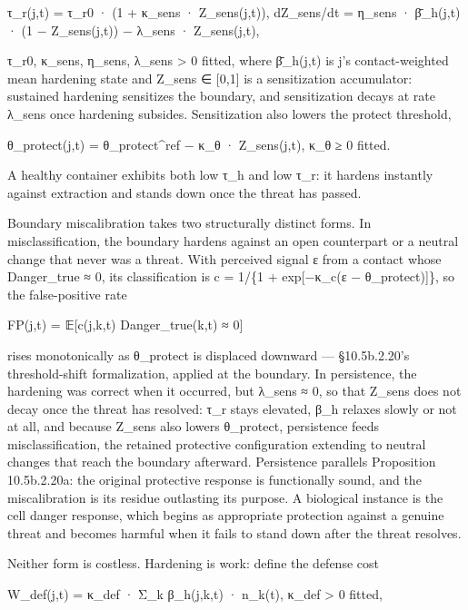 \documentclass[
]{article}
\begin{document}
τ\_r(j,t) = τ\_r0 · (1 + κ\_sens · Z\_sens(j,t)), dZ\_sens/dt = η\_sens
· β̄\_h(j,t) · (1 − Z\_sens(j,t)) − λ\_sens · Z\_sens(j,t),

τ\_r0, κ\_sens, η\_sens, λ\_sens \textgreater{} 0 fitted, where
β̄\_h(j,t) is j's contact-weighted mean hardening state and Z\_sens ∈
{[}0,1{]} is a sensitization accumulator: sustained hardening sensitizes
the boundary, and sensitization decays at rate λ\_sens once hardening
subsides. Sensitization also lowers the protect threshold,

θ\_protect(j,t) = θ\_protect\^{}ref − κ\_θ · Z\_sens(j,t), κ\_θ ≥ 0
fitted.

A healthy container exhibits both low τ\_h and low τ\_r: it hardens
instantly against extraction and stands down once the threat has passed.

Boundary miscalibration takes two structurally distinct forms. In
misclassification, the boundary hardens against an open counterpart or a
neutral change that never was a threat. With perceived signal ε from a
contact whose Danger\_true ≈ 0, its classification is c = 1/\{1 +
exp{[}−κ\_c(ε − θ\_protect){]}\}, so the false-positive rate

FP(j,t) = 𝔼{[}c(j,k,t) Danger\_true(k,t) ≈ 0{]}

rises monotonically as θ\_protect is displaced downward ---
§10.5b.2.20's threshold-shift formalization, applied at the boundary. In
persistence, the hardening was correct when it occurred, but λ\_sens ≈
0, so that Z\_sens does not decay once the threat has resolved: τ\_r
stays elevated, β\_h relaxes slowly or not at all, and because Z\_sens
also lowers θ\_protect, persistence feeds misclassification, the
retained protective configuration extending to neutral changes that
reach the boundary afterward. Persistence parallels Proposition
10.5b.2.20a: the original protective response is functionally sound, and
the miscalibration is its residue outlasting its purpose. A biological
instance is the cell danger response, which begins as appropriate
protection against a genuine threat and becomes harmful when it fails to
stand down after the threat resolves.

Neither form is costless. Hardening is work: define the defense cost

W\_def(j,t) = κ\_def · Σ\_k β\_h(j,k,t) · n\_k(t), κ\_def \textgreater{}
0 fitted,
\end{document}
